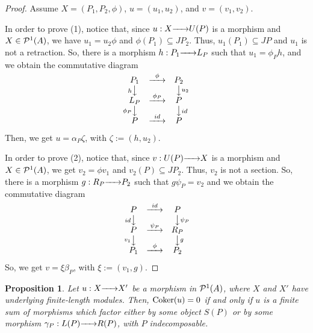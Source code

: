 \documentclass{article}
\newtheorem{proposition}[theorem]{Proposition}
\theoremstyle{definition}
\newcommand{\Coker}{{ \rm Coker }}
\newcommand{\rightmap}[1]{\smash{\mathop{\hbox to 
20pt{\rightarrowfill}}\limits^{#1}}}
\newcommand{\shortlmapdown}[1]
{\llap{$\vcenter{\hbox{$\scriptstyle#1$}}$}\big\downarrow}
\newcommand{\shortrmapdown}[1]
{\big\downarrow\rlap{$\vcenter{\hbox{$\scriptstyle#1$}}$}}
\begin{document}
\begin{proof} Assume $X=(P_1,P_2,\phi)$,  $u=(u_1,u_2)$, and $v=(v_1,v_2)$.  

In order to prove (1), notice that, since $u:X\rightmap{}U(P)$ is a morphism and $X\in {\cal P}^1(A)$, we have $u_1=u_2\phi$ and $\phi(P_1)\subseteq JP_2$. Thus, $u_1(P_1)\subseteq JP$ and $u_1$ is not a retraction. So,  there is a morphism $h:P_1\rightmap{}L_P$ such that $u_1=\phi_P h$,  and we obtain the commutative diagram 
$$\begin{matrix} 
P_1&\rightmap{\phi}&P_2\\
\shortlmapdown{h}&&\shortrmapdown{u_2}\\
L_P&\rightmap{\phi_P}&P\\
\shortlmapdown{\phi_P}&&\shortrmapdown{id}\\
P&\rightmap{id}&P\\
\end{matrix}$$ 
Then, we get $u=\alpha_P\zeta$, with $\zeta:=(h,u_2)$. 

In order to prove (2), notice that, since $v:U(P)\rightmap{}X$ is a morphism and $X\in {\cal P}^1(A)$, we get $v_2=\phi v_1$ and $v_2(P)\subseteq JP_2$. Thus,   $v_2$ is not a section. So, there is a morphism  $g:R_P\rightmap{}P_2$ such that $g\psi_P=v_2$ and we obtain the commutative diagram
$$\begin{matrix}
 P&\rightmap{id}&P\\
\shortlmapdown{id}&&\shortrmapdown{\psi_P}\\
P&\rightmap{\psi_P}&R_P\\
\shortlmapdown{v_1}&&\shortrmapdown{g}\\
P_1&\rightmap{\phi}&P_2\\
\end{matrix}$$ 
So, we get $v=\xi \beta_P$, with $\xi:=(v_1,g)$. 
\end{proof}


\begin{proposition}\label{P: caract de u con cokeru=0}
Let $u:X\rightmap{}X'$ be a morphism in ${\cal P}^1(A)$, where $X$ and $X'$ have underlying finite-length modules. Then, $\Coker(u)=0$ if and only if $u$ is a finite sum of morphisms which factor either by some object $S(P)$ or by some morphism $\gamma_P:L(P)\rightmap{}R(P)$, with $P$ indecomposable. 
\end{proposition}
\end{document}
